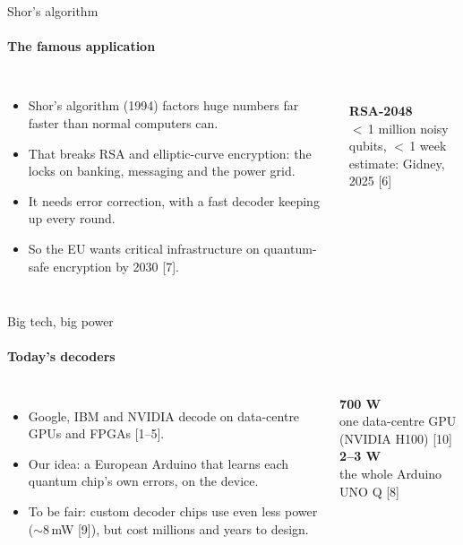 \documentclass[aspectratio=169,11pt]{beamer}
\newcommand{\eur}{\texteuro}
\newcommand{\hl}[1]{{\color{accent}#1}}
\newcommand{\dimnote}[1]{{\color{dim}\small #1}}
\newcommand{\bignum}[2]{{\color{#1}\fontsize{40}{44}\selectfont\bfseries #2}}
\begin{document}
\begin{frame}{Shor's algorithm}\framesubtitle{The famous application}
  \begin{columns}[c]
    \begin{itemize}\setlength\itemsep{0.7em}
      \item Shor's algorithm (1994) factors huge numbers far faster than normal computers can.
      \item That breaks RSA and elliptic-curve encryption: the locks on banking, messaging and the power grid.
      \item It needs \hl{error correction}, with a fast decoder keeping up every round.
      \item \dimnote{So the EU wants critical infrastructure on quantum-safe encryption by 2030 [7].}
    \end{itemize}
    \centering
    \\[0.6em]
    {\Huge\bfseries RSA-2048}\\[0.3em]
    \hl{$<$\,1 million noisy qubits, $<$\,1 week}\\
    \dimnote{estimate: Gidney, 2025 [6]}
  \end{columns}
\end{frame}

\begin{frame}{Big tech, big power}\framesubtitle{Today's decoders}
  \begin{columns}[c]
    \begin{itemize}\setlength\itemsep{0.7em}
      \item Google, IBM and NVIDIA decode on data-centre GPUs and FPGAs [1--5].
      \item \hl{Our idea:} a \eur60 European Arduino that learns each quantum chip's own errors, \hl{on the device}.
      \item \dimnote{To be fair: custom decoder chips use even less power ($\sim$8\,mW [9]), but cost millions and years to design.}
    \end{itemize}
    \centering
    \bignum{red}{700 W}\\ \dimnote{one data-centre GPU (NVIDIA H100) [10]}\\[1.2em]
    \bignum{green}{2--3 W}\\ \dimnote{the whole Arduino UNO Q [8]}
  \end{columns}
\end{frame}
\end{document}
